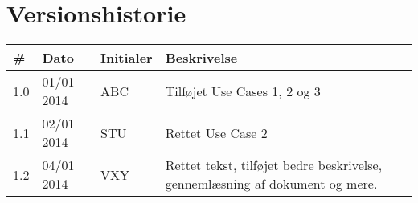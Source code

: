 \documentclass[Main]{subfiles}
\begin{document}
\section*{Versionshistorie}
\begin{tabular}{p{} p{} p{} p{}}
\hline
\textbf{\#} & \textbf{Dato} & \textbf{Initialer} & \textbf{Beskrivelse } \\ \hline
\rowcolor{gr}1.0 & 01/01 2014 & ABC & Tilføjet Use Cases 1, 2 og 3 \\ 
1.1 & 02/01 2014 & STU & Rettet Use Case 2 \\
\rowcolor{gr} 1.2 & 04/01 2014 & VXY & Rettet tekst, tilføjet bedre beskrivelse, gennemlæsning af dokument og mere.\\ \hline
\end{tabular} 
\end{document}
